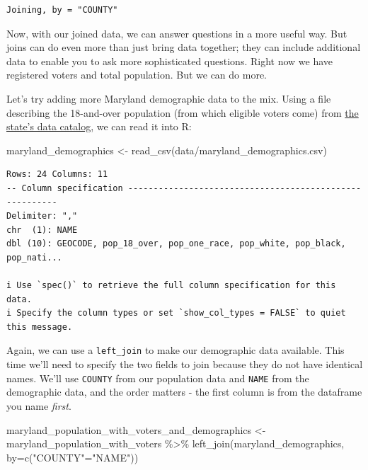 \documentclass[
  letterpaper,
  DIV=11,
  numbers=noendperiod]{scrreprt}
\newenvironment{Shaded}{\begin{snugshade}}{\end{snugshade}}
\newcommand{\AttributeTok}[1]{\textcolor[rgb]{0.40,0.45,0.13}{#1}}
\newcommand{\FunctionTok}[1]{\textcolor[rgb]{0.28,0.35,0.67}{#1}}
\newcommand{\NormalTok}[1]{\textcolor[rgb]{0.00,0.23,0.31}{#1}}
\newcommand{\OtherTok}[1]{\textcolor[rgb]{0.00,0.23,0.31}{#1}}
\newcommand{\SpecialCharTok}[1]{\textcolor[rgb]{0.37,0.37,0.37}{#1}}
\newcommand{\StringTok}[1]{\textcolor[rgb]{0.13,0.47,0.30}{#1}}
\begin{document}
\begin{verbatim}
Joining, by = "COUNTY"
\end{verbatim}

Now, with our joined data, we can answer questions in a more useful way.
But joins can do even more than just bring data together; they can
include additional data to enable you to ask more sophisticated
questions. Right now we have registered voters and total population. But
we can do more.

Let's try adding more Maryland demographic data to the mix. Using a file
describing the 18-and-over population (from which eligible voters come)
from
\href{https://planning.maryland.gov/MSDC/Pages/census/Census2020/pL_2020redistricting.aspx}{the
state's data catalog}, we can read it into R:

\begin{Shaded}
\begin{Highlighting}[]
\NormalTok{maryland\_demographics }\OtherTok{\textless{}{-}} \FunctionTok{read\_csv}\NormalTok{(}\StringTok{\textquotesingle{}data/maryland\_demographics.csv\textquotesingle{}}\NormalTok{)}
\end{Highlighting}
\end{Shaded}

\begin{verbatim}
Rows: 24 Columns: 11
-- Column specification --------------------------------------------------------
Delimiter: ","
chr  (1): NAME
dbl (10): GEOCODE, pop_18_over, pop_one_race, pop_white, pop_black, pop_nati...

i Use `spec()` to retrieve the full column specification for this data.
i Specify the column types or set `show_col_types = FALSE` to quiet this message.
\end{verbatim}

Again, we can use a \texttt{left\_join} to make our demographic data
available. This time we'll need to specify the two fields to join
because they do not have identical names. We'll use \texttt{COUNTY} from
our population data and \texttt{NAME} from the demographic data, and the
order matters - the first column is from the dataframe you name
\emph{first}.

\begin{Shaded}
\begin{Highlighting}[]
\NormalTok{maryland\_population\_with\_voters\_and\_demographics }\OtherTok{\textless{}{-}}\NormalTok{ maryland\_population\_with\_voters }\SpecialCharTok{\%\textgreater{}\%} \FunctionTok{left\_join}\NormalTok{(maryland\_demographics, }\AttributeTok{by=}\FunctionTok{c}\NormalTok{(}\StringTok{"COUNTY"}\OtherTok{=}\StringTok{"NAME"}\NormalTok{))}
\end{Highlighting}
\end{Shaded}
\end{document}
